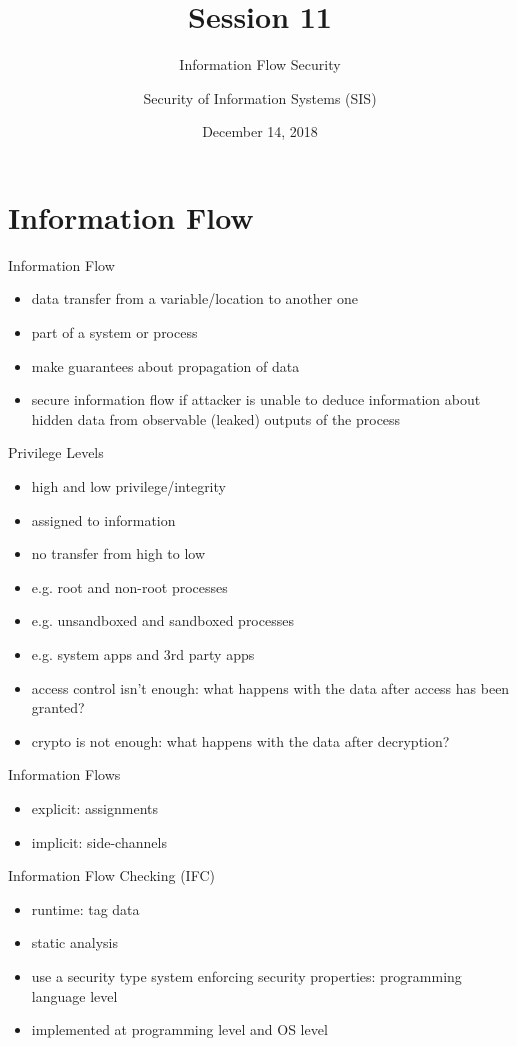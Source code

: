 \documentclass{curs}
\title[Session 11]{Session 11}
\subtitle{Information Flow Security}
\author{Security of Information Systems (SIS)}
\date{December 14, 2018}
\begin{document}
\frame{\titlepage}

\section{Information Flow}

\begin{frame}{Information Flow}
  \begin{itemize}
    \item data transfer from a variable/location to another one
    \item part of a system or process
    \item make guarantees about propagation of data
    \item secure information flow if attacker is unable to deduce information about hidden data from observable (leaked) outputs of the process
  \end{itemize}
\end{frame}

\begin{frame}{Privilege Levels}
  \begin{itemize}
    \item high and low privilege/integrity
    \item assigned to information
    \item no transfer from high to low
    \item e.g. root and non-root processes
    \item e.g. unsandboxed and sandboxed processes
    \item e.g. system apps and 3rd party apps
    \item access control isn't enough: what happens with the data after access has been granted?
    \item crypto is not enough: what happens with the data after decryption?
  \end{itemize}
\end{frame}

\begin{frame}{Information Flows}
  \begin{itemize}
    \item explicit: assignments
    \item implicit: side-channels
  \end{itemize}
\end{frame}

\begin{frame}{Information Flow Checking (IFC)}
  \begin{itemize}
    \item runtime: tag data
    \item static analysis
    \item use a security type system enforcing security properties: programming language level
    \item implemented at programming level and OS level
  \end{itemize}
\end{frame}
\end{document}
